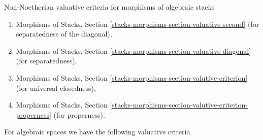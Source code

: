 \medskip\noindent
Non-Noetherian valuative criteria for morphisms of algebraic stacks
\begin{enumerate}
\item Morphisms of Stacks, Section
\ref{stacks-morphisms-section-valuative-second}
(for separatedness of the diagonal),
\item Morphisms of Stacks, Section
\ref{stacks-morphisms-section-valuative-diagonal}
(for separatedness),
\item Morphisms of Stacks, Section
\ref{stacks-morphisms-section-valutive-criterion}
(for universal closedness),
\item Morphisms of Stacks, Section
\ref{stacks-morphisms-section-valutive-criterion-properness}
(for properness).
\end{enumerate}
For algebraic spaces we have the following valuative criteria
